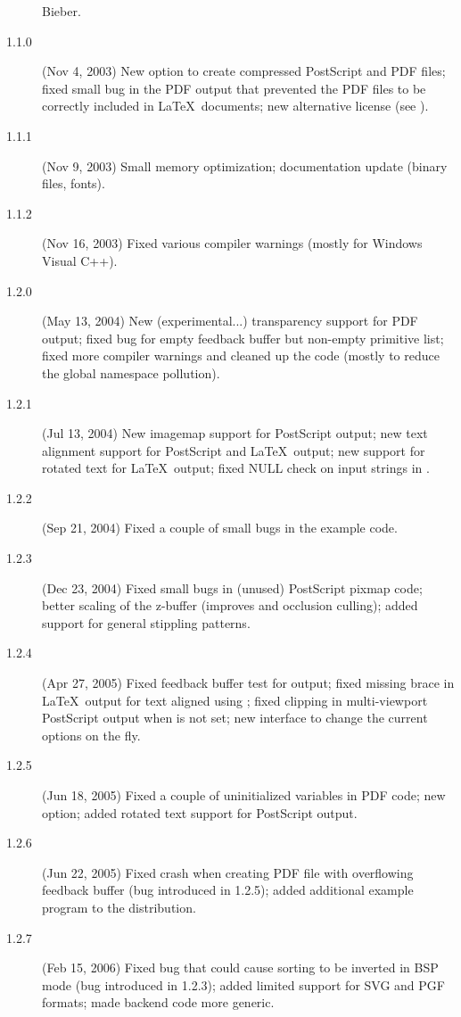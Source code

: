 \begin{description}
  Bieber.
\item[1.1.0] (Nov 4, 2003) New  option to create
  compressed PostScript and PDF files; fixed small bug in the PDF
  output that prevented the PDF files to be correctly included in
  \LaTeX\ documents; new alternative license (see ).
\item[1.1.1] (Nov 9, 2003) Small memory optimization; documentation update
  (binary files, fonts).
\item[1.1.2] (Nov 16, 2003) Fixed various compiler warnings (mostly
  for Windows Visual C++).
\item[1.2.0] (May 13, 2004) New (experimental...) transparency support for
  PDF output; fixed bug for empty feedback buffer but non-empty primitive
  list; fixed more compiler warnings and cleaned up the code (mostly to
  reduce the global namespace pollution).
\item[1.2.1] (Jul 13, 2004) New imagemap support for PostScript output; new
 text alignment support for PostScript and \LaTeX\ output; new support for
 rotated text for \LaTeX\ output; fixed NULL check on input strings in
 .
\item[1.2.2] (Sep 21, 2004) Fixed a couple of small bugs in the example
  code.
\item[1.2.3] (Dec 23, 2004) Fixed small bugs in (unused) PostScript pixmap
  code; better scaling of the z-buffer (improves
   and occlusion culling); added support
  for general stippling patterns.
\item[1.2.4] (Apr 27, 2005) Fixed feedback buffer test for
   output; fixed missing brace in \LaTeX\ output for
  text aligned using ; fixed clipping in
  multi-viewport PostScript output when  is
  not set; new  interface to change the current
  options on the fly.
\item[1.2.5] (Jun 18, 2005) Fixed a couple of uninitialized variables in
  PDF code; new  option; added rotated
  text support for PostScript output.
\item[1.2.6] (Jun 22, 2005) Fixed crash when creating PDF file with
  overflowing feedback buffer (bug introduced in 1.2.5); added
  additional example program  to the
  distribution.
\item[1.2.7] (Feb 15, 2006) Fixed bug that could cause sorting to be
  inverted in BSP mode (bug introduced in 1.2.3); added limited
  support for SVG and PGF formats; made backend code more generic.

\end{description}
